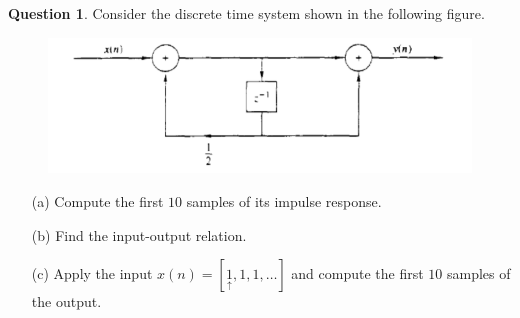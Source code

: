 \documentclass[12pt]{article}
\theoremstyle{definition}
\newtheorem{question}{Question}
\begin{document}
\begin{question}
    Consider the discrete time system shown in the following figure.

    \begin{figure}[H]
        \centering
        \includegraphics[width = 0.8\linewidth]{q_figure1.png}
    \end{figure}

    \begin{enumerate}
        \item[(a)] Compute the first $10$ samples of its impulse response.
        \item[(b)] Find the input-output relation.
        \item[(c)] Apply the input $x(n) = [\underset{\uparrow}{1}, 1, 1, \dots ]$ and compute the first $10$ samples of the output.  
    \end{enumerate}
\end{question}
\end{document}
